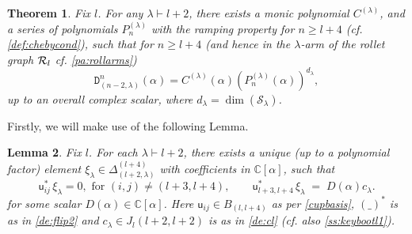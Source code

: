 \documentclass{article}
\newcommand{\ppm}[1]{\textcolor{red}{#1}}
\newcommand{\ppmm}[1]{#1}  %
\newcommand{\bajm}[1]{\textcolor{blue}{#1}}
\newtheorem{theorem}{Theorem}[section]
\newtheorem{lemma}[theorem]{Lemma}
\theoremstyle{definition}
\newcommand{\beq}{\begin{equation}}
\newcommand{\eq}{\end{equation}}
\newcommand{\xx}{\alpha}       %
\newcommand{\Delt}[2]{\Delta^{#1}_{(#2)}}  %
\newcommand{\Deltt}{{\mathtt D}}   %
\newcommand{\Delttt}[2]{\Deltt^{#1}_{(#2)}}  %
\def\uu{{\mathsf u}} %
\def\SS{\mathcal{S}} %
\def\a{\alpha}
\def\l{\lambda}
\def\C{\mathbb{C}}
\numberwithin{equation}{subsection}
\begin{document}
\begin{theorem} \label{thm:main} 
Fix $l$. For any $\l\vdash l+2$, there exists a monic polynomial $C^{(\l)}$, and a series of polynomials $P_{n}^{(\l)}$ with the ramping property for $n\geq l+4$ (\textit{cf.} \ref{def:chebycond}), such that for $n\geq l+4$ 
(and hence in the $\l$-arm of the rollet graph ${\mathcal{R}}_l$ \textit{cf.} \ref{pa:rollarms})    %
\beq 
\Delttt{n}{n-2,\l}(\a) =   C^{(\l)}(\a) (P_{n}^{(\l)}(\a))^{d_{\l}},
\label{eq:detform}
\eq
up to an overall complex scalar, 
\ppmm{where $d_\l =\dim(\SS_\l)$}.
\end{theorem}

Firstly, we will make use of the following Lemma.

\begin{lemma}\label{lem:xi} 
Fix $l$. For each $\l\vdash l+2$, there exists a unique (up to a polynomial factor) %
element $\xi_{\l} \in \Delta^{(l+4)}_{(l+2,\l)}$ with coefficients in $\C[\a]$, such that 
\beq
\uu_{ij}^* \, \xi_{\l} = 0, \text{ for } (i,j)\neq (l+3,l+4), \qquad 
    \uu_{l+3,l+4}^*\, \xi_{\l}  \ppmm{\;=\; D(\xx)} c_\l.  \label{eq:van}
\eq  
\ppmm{for some scalar $D(\xx)\in \C[\a]$.} 
Here $\uu_{ij}\in B_{(l,l+4)}$ as per \eqref{cupbasis}, $(\_)^*$ is as in \ref{de:flip2} and $c_\l \in J_{l}(l+2,l+2)$ is as in \ref{de:cl} (\textit{cf.} also \ref{ss:keybootl1}).%
\end{lemma}
\end{document}
